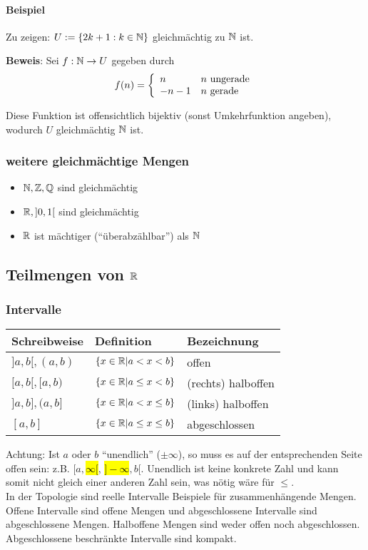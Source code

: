 \paragraph{Beispiel}
Zu zeigen: $U := \{ 2k + 1: k \in \mathbb{N} \}$ gleichmächtig zu $\mathbb{N}$ ist.

\textbf{Beweis}: Sei $f: \mathbb{N} \rightarrow U$ gegeben durch
\begin{equation*}
f(n) = \left\{
	\begin{array}{l l}
		n & n \text{ ungerade}\\
		-n - 1 & n \text{ gerade}
	\end{array}
\right.
\end{equation*}

Diese Funktion ist offensichtlich bijektiv (sonst Umkehrfunktion angeben), wodurch $U$ gleichmächtig $\mathbb{N}$ ist.

\subsubsection{weitere gleichmächtige Mengen}
\begin{itemize}
	\item $\mathbb{N}, \mathbb{Z}, \mathbb{Q}$ sind gleichmächtig
	\item $\mathbb{R}, ]0,1[$ sind gleichmächtig
	\item $\mathbb{R}$ ist mächtiger (``überabzählbar'') als $\mathbb{N}$
\end{itemize}

\subsection{Teilmengen von $\mathbb{R}$}
\subsubsection{Intervalle}
\begin{tabular}{|l|l|l|}\hline
Schreibweise & Definition & Bezeichnung\\\hline
$]a, b[, (a,b)$ & $\{x \in \mathbb{R} | a < x < b\}$ & offen\\\hline
$[a, b[, [a, b)$ & $\{x \in \mathbb{R} | a \leq x < b\}$ & (rechts) halboffen \\\hline
$]a,b], (a, b]$ & $\{x \in \mathbb{R} | a < x \leq b\}$ & (links) halboffen \\\hline
$[a,b]$ & $\{x \in \mathbb{R} | a \leq x \leq b\}$ & abgeschlossen \\\hline
\end{tabular}

Achtung: Ist $a$ oder $b$ ``unendlich'' ($\pm \infty$), so muss es auf der entsprechenden Seite offen sein: z.B. $[a, $\hl{$\infty[$}, \hl{$]-\infty$}$, b[$.
Unendlich ist keine konkrete Zahl und kann somit nicht gleich einer anderen Zahl sein, was nötig wäre für $\leq$. \\
In der Topologie sind reelle Intervalle Beispiele für zusammenhängende Mengen. Offene Intervalle sind offene Mengen und abgeschlossene Intervalle sind abgeschlossene Mengen. Halboffene Mengen sind weder offen noch abgeschlossen. Abgeschlossene beschränkte Intervalle sind kompakt.

